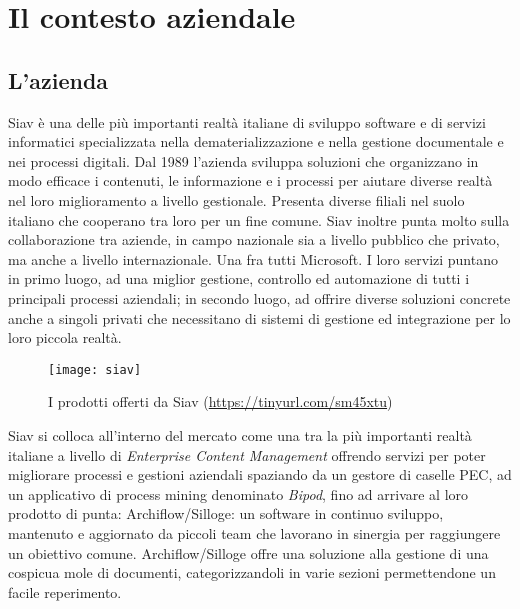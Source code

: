 
\chapter{Il contesto aziendale}
\label{cap:il-contesto-aziendale}
\section{L'azienda}
Siav è una delle più importanti realtà italiane di sviluppo software e di servizi informatici specializzata nella dematerializzazione e nella gestione documentale e nei processi digitali. Dal 1989 l'azienda sviluppa soluzioni che organizzano in modo efficace i contenuti, le informazione e i processi per aiutare diverse realtà nel loro miglioramento a livello gestionale. Presenta diverse filiali nel suolo italiano che cooperano tra loro per un fine comune. Siav inoltre punta molto sulla collaborazione tra aziende, in campo nazionale sia a livello pubblico che privato, ma anche a livello internazionale. Una fra tutti Microsoft.
I loro servizi puntano in primo luogo, ad una miglior gestione, controllo ed automazione di tutti i principali processi aziendali; in secondo luogo, ad offrire diverse soluzioni concrete anche a singoli privati che necessitano di sistemi di gestione ed integrazione per lo loro piccola realtà.
\begin{figure}[!h] 
	\centering 
	\texttt{[image: siav]} 
	\caption{I prodotti offerti da Siav (\url{https://tinyurl.com/sm45xtu})}
\end{figure}
Siav si colloca all'interno del mercato come una tra la più importanti realtà italiane a livello di \textit{Enterprise Content Management} offrendo servizi per poter migliorare processi e gestioni aziendali spaziando da un gestore di caselle PEC, ad un applicativo di process mining denominato \textit{Bipod}, fino ad arrivare al loro prodotto di punta: Archiflow/Silloge: un software in continuo sviluppo, mantenuto e aggiornato da piccoli team che lavorano in sinergia per raggiungere un obiettivo comune. Archiflow/Silloge offre una soluzione alla gestione di una cospicua mole di documenti, categorizzandoli in varie sezioni permettendone un facile reperimento.
